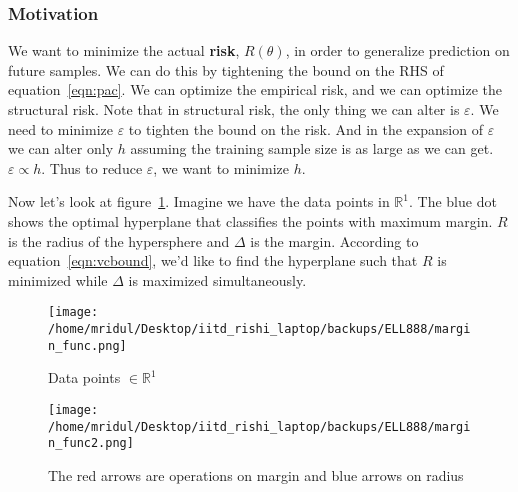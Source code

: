 \documentclass[11pt]{article}
\begin{document}
\subsubsection{Motivation}
We want to minimize the actual {\bf risk}, $R(\theta)$, in order to generalize
prediction on future samples. We can do this by tightening the bound on the RHS
of equation~\ref{eqn:pac}. We can optimize the empirical risk, and we can
optimize the structural risk. Note that in structural risk, the only thing we
can alter is $\varepsilon$. We need to minimize $\varepsilon$ to tighten the
bound on the risk. And in the expansion of $\varepsilon$ we can alter only $h$
assuming the training sample size is as large as we can get.
$\varepsilon\propto h$. Thus to reduce $\varepsilon$, we want to minimize
$h$.\par
Now let's look at figure~\ref{fig:1}. Imagine we have the data points in
$\mathbb{R}^1$. The blue dot shows the optimal hyperplane that classifies the
points with maximum margin. $R$ is the radius of the hypersphere and $\Delta$ is
the margin. According to equation~\ref{eqn:vcbound}, we'd like to find the
hyperplane such that $R$ is minimized while $\Delta$ is maximized
simultaneously.
\begin{figure}[!htbp]
    \centering
    \texttt{[image: /home/mridul/Desktop/iitd\_rishi\_laptop/backups/ELL888/margin\_func.png]}
    \caption{\label{fig:1}Data points $\in\mathbb{R}^1$}
\end{figure}
\begin{figure}[!htbp]
    \centering
    \texttt{[image: /home/mridul/Desktop/iitd\_rishi\_laptop/backups/ELL888/margin\_func2.png]}
    \caption{\label{fig:2}The red arrows are operations on margin and blue
    arrows on radius}
\end{figure}
\end{document}
